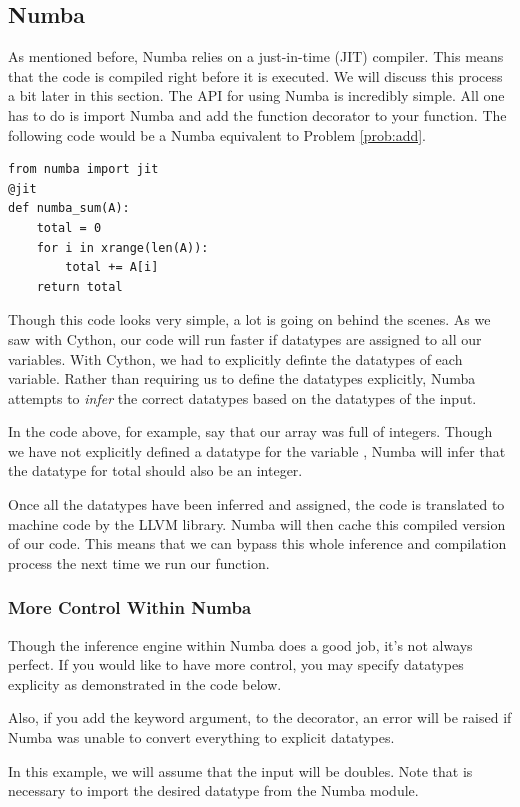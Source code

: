 \subsection*{Numba}
As mentioned before, Numba relies on a just-in-time (JIT) compiler. This means that the code is compiled right before it is executed. We will discuss this process a bit later in this section.
The API for using Numba is incredibly simple. All one has to do is import Numba and add the  function decorator to your function. The following code would be a Numba equivalent to Problem \ref{prob:add}.
\begin{lstlisting}
from numba import jit
@jit
def numba_sum(A):
    total = 0
    for i in xrange(len(A)):
        total += A[i]
    return total
\end{lstlisting}

Though this code looks very simple, a lot is going on behind the scenes. As we saw with Cython, our code will run faster if datatypes are assigned to all our variables. With Cython, we had to explicitly definte the datatypes of each variable. Rather than requiring us to define the datatypes explicitly, Numba attempts to \emph{infer} the correct datatypes based on the datatypes of the input.

In the code above, for example, say that our array  was full of integers. Though we have not explicitly defined a datatype for the variable , Numba will infer that the datatype for total should also be an integer.

Once all the datatypes have been inferred and assigned, the code is translated to machine code by the LLVM library. Numba will then cache this compiled version of our code. This means that we can bypass this whole inference and compilation process the next time we run our function.

\subsubsection*{More Control Within Numba}
Though the inference engine within Numba does a good job, it's not always perfect. If you would like to have more control, you may specify datatypes explicity as demonstrated in the code below. 

Also, if you add the keyword argument,  to the  decorator, an error will be raised if Numba was unable to convert everything to explicit datatypes.

In this example, we will assume that the input will be doubles. Note that is necessary to import the desired datatype from the Numba module. 

